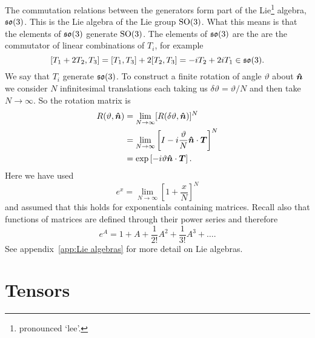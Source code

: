 The commutation relations between the generators form part of the Lie\footnote{pronounced `lee'.} algebra, \(\mathfrak{so}(3)\).
This is the Lie algebra of the Lie group \(\mathrm{SO}(3)\).
What this means is that the elements of \(\mathfrak{so}(3)\) generate \(\mathrm{SO}(3)\).
The elements of \(\mathfrak{so}(3)\) are the are the commutator of linear combinations of \(T_i\), for example 
\[[T_1 + 2T_2, T_3] = [T_1, T_3] + 2[T_2, T_3] = -iT_2 + 2iT_1 \in \mathfrak{so}(3).\]
We say that \(T_i\) generate \(\mathfrak{so}(3)\).
To construct a finite rotation of angle \(\vartheta\) about \(\bm{\hat{n}}\) we consider \(N\) infinitesimal translations each taking us \(\delta\vartheta = \vartheta/N\) and then take \(N\to\infty\).
So the rotation matrix is
\begin{align*}
    R(\vartheta, \bm{\hat{n}}) &= \lim_{N\to\infty} [R(\delta\vartheta, \bm{\hat{n}})]^N\\
    &= \lim_{N\to\infty} \left[I - i \frac{\vartheta}N{}\bm{\hat{n}}\cdot\bm{T}\right]^N\\
    &= \exp\left[-i\vartheta\bm{\hat{n}}\cdot\bm{T}\right].
\end{align*}
Here we have used
\[e^x = \lim_{N\to\infty}\left[1 + \frac{x}{N}\right]^N\]
and assumed that this holds for exponentials containing matrices.
Recall also that functions of matrices are defined through their power series and therefore
\[e^A = 1 + A + \frac{1}{2!}A^2 + \frac{1}{3!}A^3 + \dotsc.\]
See appendix~\ref{app:Lie algebras} for more detail on Lie algebras.


\section{Tensors}
